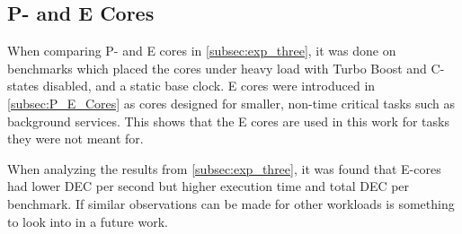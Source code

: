 \subsection{P- and E Cores}

When comparing P- and E cores in \cref{subsec:exp_three}, it was done on benchmarks which placed the cores under heavy load with Turbo Boost and C-states disabled, and a static base clock. E cores were introduced in \cref{subsec:P_E_Cores} as cores designed for smaller, non-time critical tasks such as background services. This shows that the E cores are used in this work for tasks they were not meant for.

When analyzing the results from \cref{subsec:exp_three}, it was found that E-cores had lower DEC per second but higher execution time and total DEC per benchmark. If similar observations can be made for other workloads is something to look into in a future work.
















